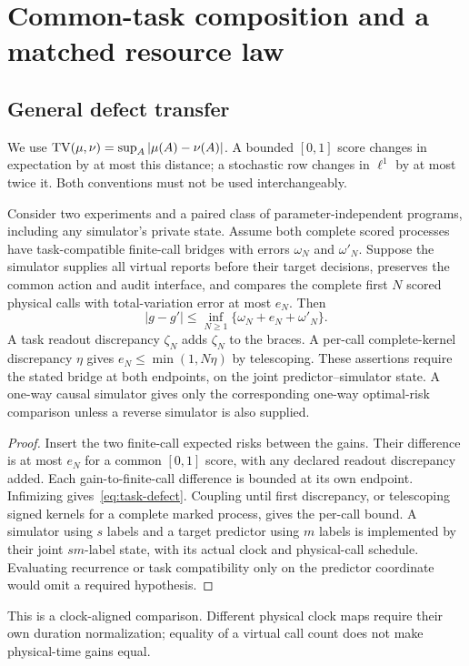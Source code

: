 \section{Common-task composition and a matched resource law}\label{sec:composition}
\subsection{General defect transfer}
We use $\operatorname{TV}(\mu,\nu)=\sup_A|\mu(A)-\nu(A)|$. A bounded $[0,1]$ score changes in expectation by at most this distance; a stochastic row changes in $\ell^1$ by at most twice it. Both conventions must not be used interchangeably.

\begin{proposition}\label{prop:defect}
Consider two experiments and a paired class of parameter-independent programs, including any simulator's private state. Assume both complete scored processes have task-compatible finite-call bridges with errors $\omega_N$ and $\omega'_N$. Suppose the simulator supplies all virtual reports before their target decisions, preserves the common action and audit interface, and compares the complete first $N$ scored physical calls with total-variation error at most $e_N$. Then
\begin{equation}\label{eq:task-defect}
 |g-g'|\le\inf_{N\ge1}\{\omega_N+e_N+\omega'_N\}.
\end{equation}
A task readout discrepancy $\zeta_N$ adds $\zeta_N$ to the braces. A per-call complete-kernel discrepancy $\eta$ gives $e_N\le\min(1,N\eta)$ by telescoping. These assertions require the stated bridge at both endpoints, on the joint predictor--simulator state. A one-way causal simulator gives only the corresponding one-way optimal-risk comparison unless a reverse simulator is also supplied.
\end{proposition}
\begin{proof}
Insert the two finite-call expected risks between the gains. Their difference is at most $e_N$ for a common $[0,1]$ score, with any declared readout discrepancy added. Each gain-to-finite-call difference is bounded at its own endpoint. Infimizing gives~\eqref{eq:task-defect}. Coupling until first discrepancy, or telescoping signed kernels for a complete marked process, gives the per-call bound. A simulator using $s$ labels and a target predictor using $m$ labels is implemented by their joint $sm$-label state, with its actual clock and physical-call schedule. Evaluating recurrence or task compatibility only on the predictor coordinate would omit a required hypothesis.
\end{proof}
This is a clock-aligned comparison. Different physical clock maps require their own duration normalization; equality of a virtual call count does not make physical-time gains equal.

